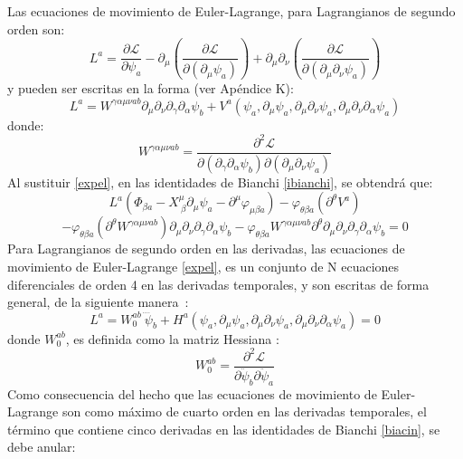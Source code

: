 \documentclass[a4paper,12pt]{article}
\begin{document}
Las ecuaciones de movimiento de Euler-Lagrange, para Lagrangianos de segundo orden son:
\begin{equation}
L^a=\frac{\partial\mathscr{L} }{\partial \psi_a}-\partial_{\mu}\left(\frac{\partial\mathscr{L} }{\partial(\partial_{\mu} \psi_a)}\right)+\partial_{\mu}\partial_{\nu}\left(\frac{\partial\mathscr{L} }{\partial(\partial_{\mu}\partial_{\nu} \psi_a)}\right) 
\end{equation}
y pueden ser escritas en la forma (ver Apéndice K):
\begin{equation}
L^a=W^{\gamma\alpha\mu\nu ab}\partial_\mu\partial_\nu\partial_\gamma\partial_\alpha\psi_b+V^a(\psi_a,\partial_\mu\psi_a,\partial_\mu\partial_\nu\psi_a,\partial_\mu\partial_\nu\partial_\alpha\psi_a) 
\label{expel}
\end{equation}
donde:
\begin{equation}
W^{\gamma\alpha\mu\nu ab}= \frac{\partial^2\mathscr{L} }{\partial( \partial_\gamma\partial_\alpha\psi_b)\partial(\partial_{\mu}\partial_{\nu} \psi_a)}
\end{equation}
Al sustituir \eqref{expel}, en las identidades de Bianchi \eqref{ibianchi}, se obtendrá que:
\begin{equation}
L^a(\Phi_{\beta a}-X_{\ \beta}^\mu\partial_\mu\psi_a-\partial^\mu\varphi_{\mu\beta a})-\varphi_{\theta\beta a}(\partial^\theta V^a)
\label{biacin}
\end{equation}
$$-\varphi_{\theta\beta a}(\partial^\theta W^{\gamma\alpha\mu\nu ab})\partial_\mu\partial_\nu\partial_\gamma\partial_\alpha\psi_b-\varphi_{\theta\beta a}W^{\gamma\alpha\mu\nu ab}\partial^\theta\partial_\mu\partial_\nu\partial_\gamma\partial_\alpha\psi_b=0$$
Para Lagrangianos de segundo orden en las derivadas, las ecuaciones de movimiento de \mbox{Euler-Lagrange} \eqref{expel}, es un conjunto de N ecuaciones diferenciales de orden 4 en las derivadas temporales, y son escritas de forma general, de la siguiente \mbox{manera \cite{podolsky}:} 
\begin{equation}
L^a=W^{ab}_0\ \ddddot\psi_b+H^a(\psi_a,\partial_\mu\psi_a,\partial_\mu\partial_\nu\psi_a,\partial_\mu\partial_\nu\partial_\alpha\psi_a) =0
\end{equation}
donde $W^{ab}_0$, es definida como la matriz Hessiana \cite{vinculos}:  
\begin{equation}
W^{ab}_0=\frac{\partial^2\mathscr{L} }{\partial\ddot\psi_b\partial\ddot \psi_a}
\end{equation}
Como consecuencia del hecho que las ecuaciones de movimiento de Euler-Lagrange son como máximo de cuarto orden en las derivadas temporales, el término que contiene cinco derivadas en las identidades de Bianchi \eqref{biacin}, se debe anular:
\end{document}
